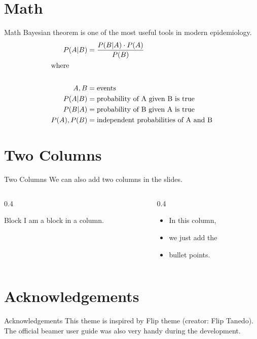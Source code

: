 \documentclass[aspectratio=169,t]{beamer}
\begin{document}
\section{Math}
\begin{frame}[t]{Math}
	Bayesian theorem is one of the most useful tools in modern epidemiology.
	\begin{align*}
		P(A | B) &= \frac{P(B | A)\cdot P(A)}{P(B)} \\
		\intertext{where}\\
		A,B &= \text{events}\\
		P(A | B) &= \text{probability of A given B is true}\\
		P(B | A) &= \text{probability of B given A is true}\\
		P(A),P(B) &= \text{independent probabilities of A and B}
	\end{align*}

\end{frame}

\section{Two Columns}
\begin{frame}[t]{Two Columns}
	We can also add two columns in the slides.
	\begin{columns}[t]
		\begin{column}[T]{0.4\textwidth}
			\lipsum[1][1-2]
			\vspace{1em}
			\begin{block}{Block}
				I am a block in a column.
			\end{block}
		\end{column}
		\begin{column}[T]{0.4\textwidth}
			\begin{itemize}
				\item In this column,
				\item we just add the
				\item bullet points.
			\end{itemize}
		\end{column}
	\end{columns}
\end{frame}

\section{Acknowledgements}
\begin{frame}[t]{Acknowledgements}
This theme is inspired by Flip theme (creator: Flip Tanedo). The official beamer user guide was also very handy during the development.
\end{frame}
\end{document}
